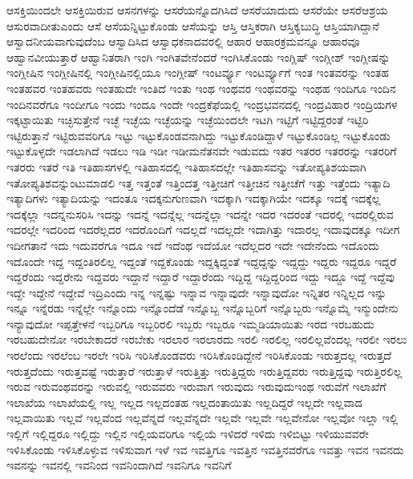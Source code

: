 {ಆಸಕ್ತಿಯಿಂದಲೇ
ಆಸಕ್ತಿಯಿರುವ
ಆಸನಗಳನ್ನು
ಆಸರೆಯನ್ನೊದಗಿಸಿದೆ
ಆಸರೆಯಾದುದು
ಆಸರೆಯೇ
ಆಸರೆಆಶ್ರಯ
ಆಸುರವಾದೀತುಎಂದು
ಆಸೆ
ಆಸೆಯನ್ನಿಟ್ಟುಕೊಂಡು
ಆಸೆಯನ್ನು
ಆಸ್ತಿ
ಆಸ್ತಿಕರಾಗಿ
ಆಸ್ತಿಕ್ಯಬುದ್ಧಿ
ಆಸ್ತಿಯಾಗಿದ್ದಾನೆ
ಆಸ್ವಾದನೀಯವಾಗುವುದೆಂಬ
ಆಸ್ವಾದಿಸಿದ
ಆಸ್ವಾಧಕನಾದವರಲ್ಲಿ
ಆಹಾರ
ಆಹಾರಕ್ರಮವನ್ನೂ
ಆಹಾರವೂ
ಆಹ್ವಾನವೀಯುತ್ತಾರೆ
ಆಹ್ವಾನಿತರಾಗಿ
ಇಂಗಿ
ಇಂಗಿತವೇನೆಂದರೆ
ಇಂಗಿಸಿಕೊಂಡು
ಇಂಗ್ಲಿಷ್
ಇಂಗ್ಲೀಶ್
ಇಂಗ್ಲೀಷನ್ನು
ಇಂಗ್ಲೀಷಿನ
ಇಂಗ್ಲೀಷಿನಲ್ಲಿ
ಇಂಗ್ಲೀಷಿನಲ್ಲಿಯೂ
ಇಂಗ್ಲೀಷ್
ಇಂಟರ್ವ್ಯೂ
ಇಂಟರ್ವ್ಯೂಗೆ
ಇಂತ
ಇಂತವರನ್ನು
ಇಂತಹ
ಇಂತಹವರ
ಇಂತಹವರು
ಇಂತಹುದೇ
ಇಂತಿದೆ
ಇಂತು
ಇಂಥ
ಇಂಥವರ
ಇಂಥವರನ್ನು
ಇಂಥಹ
ಇಂದಿಗೂ
ಇಂದಿನ
ಇಂದಿನವರೆಗೂ
ಇಂದೀಗೂ
ಇಂದು
ಇಂದೂ
ಇಂದೇ
ಇಂದ್ರಕೆಫೆಯಲ್ಲಿ
ಇಂದ್ರಭವನದಲ್ಲಿ
ಇಂದ್ರವಿಹಾರ
ಇಂದ್ರಿಯಗಳ
ಇಕ್ಕಟ್ಟಾಯಿತು
ಇಚ್ಛಿಸುತ್ತೇನೆ
ಇಚ್ಛೆ
ಇಚ್ಛೆಯ
ಇಚ್ಛೆಯನ್ನು
ಇಚ್ಛೆಯಿಂದಲೇ
ಇಟಗಿ
ಇಟ್ಟಿಗೆ
ಇಟ್ಟಿದ್ದರಂತೆ
ಇಟ್ಟಿರಿ
ಇಟ್ಟಿರುತ್ತಾನೆ
ಇಟ್ಟಿರುವವರಿಗೂ
ಇಟ್ಟು
ಇಟ್ಟುಕೊಂಡವನಾಗಿದ್ದು
ಇಟ್ಟುಕೊಂಡಿದ್ದಾಳೆ
ಇಟ್ಟುಕೊಂಡಿಲ್ಲ
ಇಟ್ಟುಕೊಂಡು
ಇಟ್ಟುಕೊಳ್ಳದೇ
ಇಡಲಾಗಿದೆ
ಇಡಲು
ಇಡಿ
ಇಡೀ
ಇಡೀಮನೆತನವೇ
ಇಡುವದು
ಇತರ
ಇತರರ
ಇತರರನ್ನು
ಇತರರಿಗೆ
ಇತರರು
ಇತರೆ
ಇತಿ
ಇತಿಹಾಸಗಳಲ್ಲಿ
ಇತಿಹಾಸದಲ್ಲಿ
ಇತಿಹಾಸದಲ್ಲೇ
ಇತಿಹಾಸವನ್ನು
ಇತೋಪ್ಯತಿಶಯವಾಗಿ
ಇತೋಪ್ಯತಿಶವನ್ನುಂಟುಮಾಡಲಿ
ಇತ್ತ
ಇತ್ತಂತೆ
ಇತ್ತಿಂದತ್ತ
ಇತ್ತೀಚಿಗೆ
ಇತ್ತೀಚಿನ
ಇತ್ತೀಚೆಗೆ
ಇತ್ತು
ಇತ್ತೆಂದು
ಇತ್ಯಾದಿ
ಇತ್ಯಾದಿಗಳು
ಇತ್ಯಾದಿಯನ್ನು
ಇದಂತೂ
ಇದಕ್ಕನುಗುಣವಾಗಿ
ಇದಕ್ಕಾಗಿ
ಇದಕ್ಕಾಗಿಯೇ
ಇದಕ್ಕೂ
ಇದಕ್ಕೆ
ಇದಕ್ಕೆಲ್ಲ
ಇದಕ್ಕೆಲ್ಲಾ
ಇದನ್ನನುಸರಿಸಿ
ಇದನ್ನು
ಇದನ್ನೆ
ಇದನ್ನೆಲ್ಲ
ಇದನ್ನೆಲ್ಲಾ
ಇದನ್ನೇ
ಇದರ
ಇದರಂತೆ
ಇದರಲ್ಲಿ
ಇದರಲ್ಲಿರುವ
ಇದರಲ್ಲೇ
ಇದರಿಂದ
ಇದರೆಲ್ಲದರ
ಇದರೊಂದಿಗೆ
ಇದಲ್ಲದೆ
ಇದಲ್ಲದೇ
ಇದಾಗಿತ್ತು
ಇದಾರಲ್ಲ
ಇದಾವುದಕ್ಕೂ
ಇದೀಗ
ಇದೀಗತಾನೆ
ಇದು
ಇದುವರೆಗೂ
ಇದೂ
ಇದೆ
ಇದೆಂಥ
ಇದೆಯೋ
ಇದೆಲ್ಲದರ
ಇದೇ
ಇದೇನೆಂದು
ಇದೊಂದು
ಇದೊಂದೇ
ಇದ್ದ
ಇದ್ದಂತಿರಲಿಲ್ಲ
ಇದ್ದಂತೆ
ಇದ್ದಕೊಂಡು
ಇದ್ದಕ್ಕಿದ್ದಂತೆ
ಇದ್ದದ್ದನ್ನು
ಇದ್ದದ್ದು
ಇದ್ದರು
ಇದ್ದರೂ
ಇದ್ದರೆ
ಇದ್ದರೆಂದು
ಇದ್ದರೇನು
ಇದ್ದವರು
ಇದ್ದಾನೆ
ಇದ್ದಾರೆ
ಇದ್ದಾರೆಂದು
ಇದ್ದಿದ್ದ
ಇದ್ದಿದ್ದರಿಂದ
ಇದ್ದು
ಇದ್ದೂ
ಇದ್ದೆ
ಇದ್ದೆವು
ಇದ್ದೇ
ಇದ್ದೇನೆ
ಇದ್ದೇವೆ
ಇದ್ರಿಎಂದು
ಇನ್ನ
ಇನ್ನಷ್ಟು
ಇನ್ನಾವ
ಇನ್ನಾವುದೇ
ಇನ್ನಾವುದೋ
ಇನ್ನಿತರ
ಇನ್ನಿಲ್ಲದ
ಇನ್ನು
ಇನ್ನೂ
ಇನ್ನೆರಡು
ಇನ್ನೆಲ್ಲೇ
ಇನ್ನೊಂದು
ಇನ್ನೊಂದೆಡೆ
ಇನ್ನೊಬ್ಬ
ಇನ್ನೊಬ್ಬರಿಗೆ
ಇನ್ನೊಬ್ಬರು
ಇನ್ನೊಮ್ಮೆ
ಇನ್ಮುಂದೇನು
ಇನ್ಯಾವುದೋ
ಇಪ್ಪತ್ತೇಳನೆ
ಇಬ್ಬರಿಗೂ
ಇಬ್ಬರಿರಲಿ
ಇಬ್ಬರು
ಇಬ್ಬರೂ
ಇಮ್ಮಡಿಯಾಯಿತು
ಇರದ
ಇರಬಹುದು
ಇರಬಹುದೇನೋ
ಇರಬೇಕಾದರೆ
ಇರಬೇಕು
ಇರಲಾರ
ಇರಲಾರದು
ಇರಲಿ
ಇರಲಿಲ್ಲ
ಇರಲಿಲ್ಲವೆಂದಲ್ಲ
ಇರಲೀ
ಇರಲು
ಇರಲೆಂದು
ಇರಲೆಂಬ
ಇರಲೇ
ಇರಿಸಿ
ಇರಿಸಿಕೊಂಡವರು
ಇರಿಸಿಕೊಂಡಿದ್ದೇನೆ
ಇರಿಸಿಕೊಂಡು
ಇರುತ್ತದಲ್ಲ
ಇರುತ್ತದೆ
ಇರುತ್ತದೆಂದು
ಇರುತ್ತವಷ್ಟೆ
ಇರುತ್ತಾರೆ
ಇರುತ್ತಾಳೆ
ಇರುತ್ತಿತ್ತು
ಇರುತ್ತಿದ್ದರು
ಇರುತ್ತಿದ್ದವರು
ಇರುತ್ತಿದ್ದವು
ಇರುತ್ತಿರಲಿಲ್ಲ
ಇರುವ
ಇರುವಂಥವರನ್ನು
ಇರುವಲ್ಲಿ
ಇರುವವರು
ಇರುವಾಗ
ಇರುವುದು
ಇರುವುದುಇಂಥ
ಇರುವೆಗೆ
ಇಲಾಖೆಗೆ
ಇಲಾಖೆಯ
ಇಲಾಖೆಯಲ್ಲಿ
ಇಲ್ಲ
ಇಲ್ಲದ
ಇಲ್ಲದಂತಹ
ಇಲ್ಲದಂತಾಯಿತು
ಇಲ್ಲದಿದ್ದರೆ
ಇಲ್ಲದೇ
ಇಲ್ಲವಾದ
ಇಲ್ಲವಾಯಿತು
ಇಲ್ಲವೆ
ಇಲ್ಲವೆಂದ
ಇಲ್ಲವೆನ್ನದೆ
ಇಲ್ಲವೆನ್ನದೇ
ಇಲ್ಲವೇ
ಇಲ್ಲವೇ
ಇಲ್ಲವೇನೋ
ಇಲ್ಲವೋ
ಇಲ್ಲಾ
ಇಲ್ಲಿ
ಇಲ್ಲಿಗೆ
ಇಲ್ಲಿದ್ದರೂ
ಇಲ್ಲಿದ್ದು
ಇಲ್ಲಿನ
ಇಲ್ಲಿಯವರಿಗೂ
ಇಲ್ಲಿಯೆ
ಇಳಿದರೆ
ಇಳಿದು
ಇಳಿಬಿಟ್ಟು
ಇಳಿಯುವವರೇ
ಇಳಿಸಿಕೊಂಡು
ಇಳಿಸಿಕೊಳ್ಳುವ
ಇಳಿಸುವಾಗ
ಇಳೆ
ಇವ
ಇವತ್ತಿಗೂ
ಇವತ್ತಿನ
ಇವತ್ತಿನವರೆಗೂ
ಇವತ್ತು
ಇವನ
ಇವನದು
ಇವನನ್ನು
ಇವನಲ್ಲಿ
ಇವನಿಂದ
ಇವನಿಂದಾಗಿದೆ
ಇವನಿಗೂ
ಇವನಿಗೆ
}
